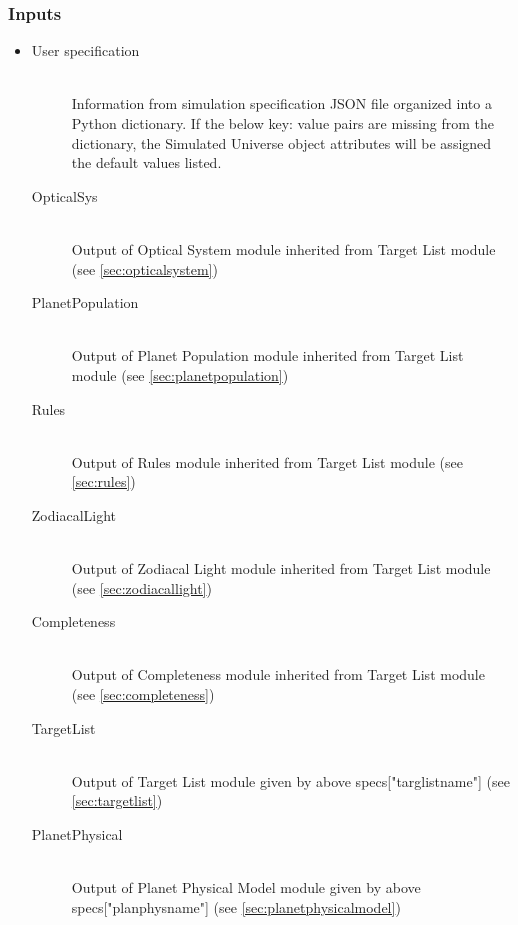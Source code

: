 \documentclass[cleanfoot]{asme2ej}
\begin{document}
\subsubsection*{Inputs}
\begin{itemize}
    \item 
    \begin{description}
        \item[User specification] \hfill \\
        Information from simulation specification JSON file organized into a Python dictionary. If the below key: value pairs are missing from the dictionary, the Simulated Universe object attributes will be assigned the default values listed.
        \item[OpticalSys] \hfill \\
        Output of Optical System module inherited from Target List module (see \ref{sec:opticalsystem})
        \item[PlanetPopulation] \hfill \\
        Output of Planet Population module inherited from Target List module (see \ref{sec:planetpopulation})
        \item[Rules] \hfill \\
        Output of Rules module inherited from Target List module (see \ref{sec:rules})
        \item[ZodiacalLight] \hfill \\
        Output of Zodiacal Light module inherited from Target List module (see \ref{sec:zodiacallight})
        \item[Completeness] \hfill \\
        Output of Completeness module inherited from Target List module (see \ref{sec:completeness})
        \item[TargetList] \hfill \\
        Output of Target List module given by above specs["targlistname"] (see \ref{sec:targetlist})
        \item[PlanetPhysical] \hfill \\
        Output of Planet Physical Model module given by above specs["planphysname"] (see \ref{sec:planetphysicalmodel})
    \end{description}
\end{itemize}
\end{document}
